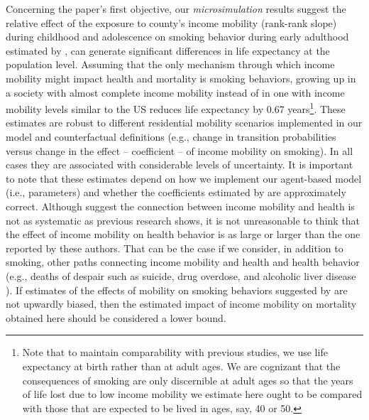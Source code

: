 \documentclass[class=article, crop=false, 12pt]{standalone}
\begin{document}

Concerning the paper's first objective, our \textit{microsimulation} results suggest the relative effect of the exposure to county's income mobility (rank-rank slope) during childhood and adolescence on smoking behavior during early adulthood estimated by \citet{daza2021}, can generate significant differences in life expectancy at the population level. Assuming that the only mechanism through which income mobility might impact health and mortality is smoking behaviors, growing up in a society with almost complete income mobility instead of in one with income mobility levels similar to the US reduces life expectancy by 0.67 years\footnote{Note that to maintain comparability with previous studies, we use life expectancy at birth rather than at adult ages. We are cognizant that the consequences of smoking are only discernible at adult ages so that the years of life lost due to low income mobility we estimate here ought to be compared with those that are expected to be lived in ages, say,  40 or 50.}. These estimates are robust to different residential mobility scenarios implemented in our model and counterfactual definitions (e.g., change in transition probabilities versus change in the effect -- coefficient -- of income mobility on smoking). In all cases they are associated with considerable levels of uncertainty. It is important to note that these estimates depend on how we implement our agent-based model (i.e., parameters) and whether the coefficients estimated by \citet{daza2021} are approximately correct. Although \citet{daza2021} suggest the connection between income mobility and health is not as systematic as previous research shows, it is not unreasonable to think that the effect of income mobility on health behavior is as large or larger than the one reported by these authors. That can be the case if we consider, in addition to smoking, other paths connecting income mobility and health and health behavior (e.g., deaths of despair such as suicide, drug overdose, and alcoholic liver disease \citep{case2020}).  If estimates of the effects of mobility on smoking behaviors suggested by \citet{daza2021} are not upwardly biased, then the estimated impact of income mobility on mortality obtained here should be considered a lower bound.
\end{document}
